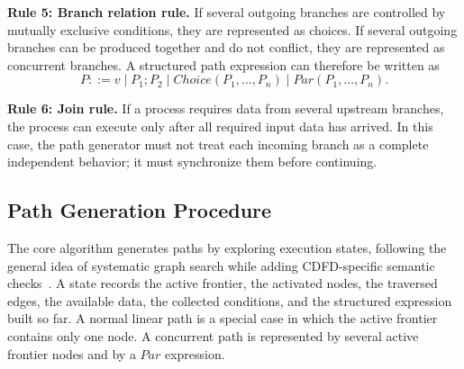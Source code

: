 \documentclass[conference]{template/IEEEtran}
\newcounter{algorithm}
\begin{document}
\textbf{Rule 5: Branch relation rule.}
If several outgoing branches are controlled by mutually exclusive conditions, they are represented as choices. If several outgoing branches can be produced together and do not conflict, they are represented as concurrent branches. A structured path expression can therefore be written as
\begin{equation}
P ::= v \mid P_1;P_2 \mid Choice(P_1,\ldots,P_n) \mid Par(P_1,\ldots,P_n).
\end{equation}

\textbf{Rule 6: Join rule.}
If a process requires data from several upstream branches, the process can execute only after all required input data has arrived. In this case, the path generator must not treat each incoming branch as a complete independent behavior; it must synchronize them before continuing.

\subsection{Path Generation Procedure}

The core algorithm generates paths by exploring execution states, following the general idea of systematic graph search while adding CDFD-specific semantic checks~\cite{cormen2022introduction}. A state records the active frontier, the activated nodes, the traversed edges, the available data, the collected conditions, and the structured expression built so far. A normal linear path is a special case in which the active frontier contains only one node. A concurrent path is represented by several active frontier nodes and by a \(Par\) expression.
\end{document}
